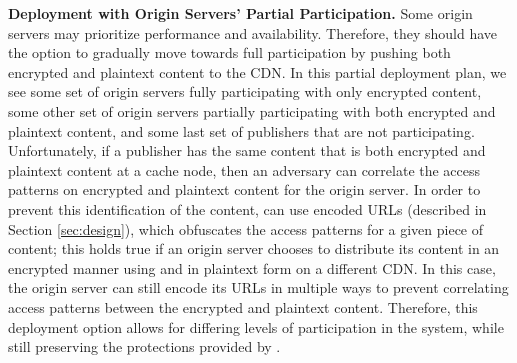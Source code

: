 \textbf{Deployment with Origin Servers' Partial Participation.} 
Some origin servers may prioritize performance 
and availability.  Therefore, they should have the option to gradually move towards full participation by pushing 
both encrypted and plaintext content to the CDN.  In this partial deployment plan, we see some set of origin servers 
fully participating with only encrypted content, some other set of origin servers partially participating with both 
encrypted and plaintext content, and some last set of publishers that are not participating.  Unfortunately, if 
a publisher has the same content that is both encrypted and plaintext content at a cache node, then an adversary can correlate the access 
patterns on encrypted and plaintext content for the origin server.  In order to prevent this identification of the 
content, \system{} can use encoded URLs (described in Section \ref{sec:design}), which obfuscates the access patterns for 
a given piece of content; this holds true if an origin server chooses to distribute its content in an encrypted manner using \system{}
 and in plaintext form on a different CDN.  In this case, the origin server can still encode its URLs in multiple ways to 
prevent correlating access patterns between the encrypted and plaintext content.  Therefore, this deployment option allows for 
differing levels of participation in the system, while still preserving the protections provided by \system{}.  





